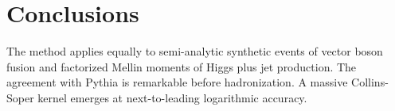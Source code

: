 \section{Conclusions}\label{sec:conclusions}

The method applies equally to semi-analytic synthetic events of vector
boson fusion and factorized Mellin moments of Higgs plus jet production.
The agreement with Pythia is remarkable before hadronization. A massive
Collins-Soper kernel emerges at next-to-leading logarithmic accuracy.


